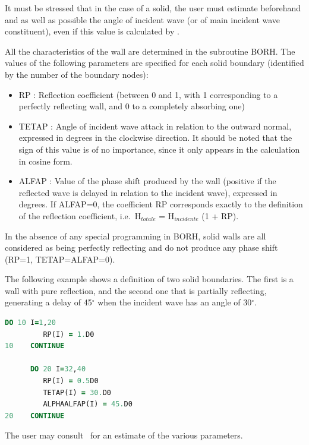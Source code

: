 It must be stressed that in the case of a solid, the user must estimate
beforehand and as well as possible the angle of incident wave (or of main
incident wave constituent), even if this value is calculated by \artemis{}.

All the characteristics of the wall are determined in the subroutine BORH\@. The
values of the following parameters are specified for each solid boundary
(identified by the number of the boundary nodes):

\begin{itemize}
\item  RP : Reflection coefficient (between 0 and 1, with 1 corresponding to a
  perfectly reflecting wall, and 0 to a completely absorbing one)

\item  TETAP : Angle of incident wave attack in relation to the outward normal,
  expressed in degrees in the clockwise direction. It should be noted that the
    sign of this value is of no importance, since it only appears in the
    calculation in cosine form.

\item  ALFAP : Value of the phase shift produced by the wall (positive if the
  reflected wave is delayed in relation to the incident wave), expressed in
    degrees. If ALFAP=0, the coefficient RP corresponds exactly to the
    definition of the reflection coefficient, i.e.\ H${}_{totale}$ =
    H${}_{incidente}$ (1 + RP).
\end{itemize}

In the absence of any special programming in BORH, solid walls are all
considered as being perfectly reflecting and do not produce any phase shift
(RP=1, TETAP=ALFAP=0).

The following example shows a definition of two solid boundaries. The first is
a wall with pure reflection, and the second one that is partially reflecting,
generating a delay of 45$\mathrm{{}^\circ}$ when the incident wave has an angle
of 30$\mathrm{{}^\circ}$.

\begin{lstlisting}[language=Fortran]
      DO 10 I=1,20
         RP(I) = 1.D0
10    CONTINUE

      DO 20 I=32,40
         RP(I) = 0.5D0
         TETAP(I) = 30.D0
         ALPHAALFAP(I) = 45.D0
20    CONTINUE
\end{lstlisting}

The user may consult~\cite{Dhellemmes2003} for an estimate of the various
parameters.


